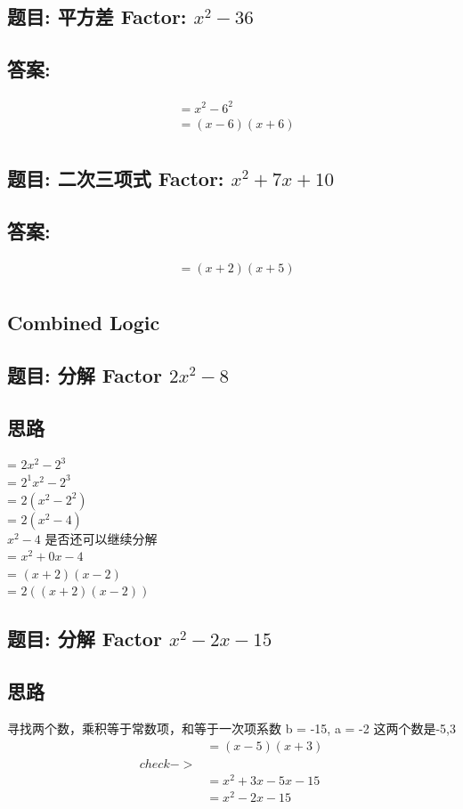 \documentclass[12pt]{article}
\begin{document}
\subsection*{题目: 平方差 Factor: $x^{2} - 36$}
\subsection*{答案:}
\begin{align*}
  &= x^{2} - 6^{2} \\
  &= (x-6)(x+6) \\
\end{align*}

\subsection*{题目: 二次三项式 Factor: $x^{2} + 7x + 10$}
\subsection*{答案:}
\begin{align*}
  &= (x+2)(x+5)\\
\end{align*}

\subsection*{Combined Logic}
\subsection*{题目: 分解 Factor $2x^{2} - 8$}
\subsection*{思路}
= $2x^{2}-2^{3}$\\
= $2^{1}x^{2}-2^{3}$\\
= $2(x^{2}-2^{2})$\\
= $2(x^{2}-4)$\\
$x^{2}-4$ 是否还可以继续分解\\
= $x^{2} + 0x -4$\\
= $(x+2)(x-2)$\\
= $2((x+2)(x-2))$\\
 
\subsection*{题目: 分解 Factor $x^{2}-2x-15$}
\subsection*{思路}
寻找两个数，乘积等于常数项，和等于一次项系数
  b = -15, a = -2
  这两个数是-5,3
\begin{align*}
  & =(x-5)(x+3) \\
  check-> \\
  &= x^{2}+3x-5x-15 \\ 
  &= x^{2}-2x-15 \\
\end{align*}
\end{document}
